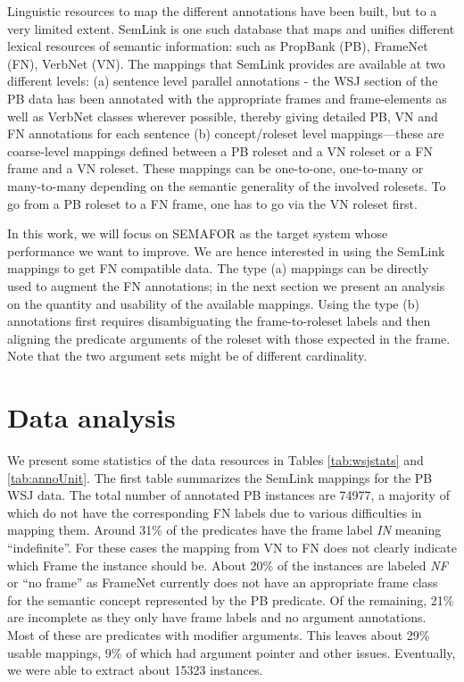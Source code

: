 \documentclass[11pt]{article}
\begin{document}
Linguistic resources to map the different annotations have been built, but to a very limited extent. SemLink \cite{semlink} is one such database that maps and unifies different lexical resources of semantic information: such as PropBank (PB), FrameNet (FN), VerbNet (VN). The mappings that SemLink provides are available at two different levels: (a) sentence level parallel annotations - the WSJ section of the PB data has been annotated with the appropriate frames and frame-elements as well as VerbNet classes wherever possible, thereby giving detailed PB, VN and FN annotations for each sentence (b) concept/roleset level mappings---these are coarse-level mappings defined between a PB roleset and a VN roleset or a FN frame and a VN roleset. These mappings can be one-to-one, one-to-many or many-to-many depending on the semantic generality of the involved rolesets. To go from a PB roleset to a FN frame, one has to go via the VN roleset first.

In this work, we will focus on SEMAFOR as the target system whose performance we want to improve. We are hence interested in using the SemLink mappings to get FN compatible data. The type (a) mappings can be directly used to augment the FN annotations; in the next section we present an analysis on the quantity and usability of the available mappings. Using the type (b) annotations first requires disambiguating the frame-to-roleset labels and then aligning the predicate arguments of the roleset with those expected in the frame. Note that the two argument sets might be of different cardinality.

\section{Data analysis}
We present some statistics of the data resources in Tables \ref{tab:wsjstats} and \ref{tab:annoUnit}. The first table summarizes the SemLink mappings for the PB WSJ data. The total number of annotated PB instances are 74977, a majority of which do not have the corresponding FN labels due to various difficulties in mapping them. Around 31\% of the predicates have the frame label \textit{IN} meaning ``indefinite''. For these cases the mapping from VN to FN does not clearly indicate which Frame the instance should be. About 20\% of the instances are labeled \textit{NF} or ``no frame'' as FrameNet currently does not have an appropriate frame class for the semantic concept represented by the PB predicate. Of the remaining, 21\% are incomplete as they only have frame labels and no argument annotations. Most of these are predicates with modifier arguments. This leaves about 29\% usable mappings, 9\% of which had argument pointer and other issues. Eventually, we were able to extract about 15323 instances.
\end{document}
